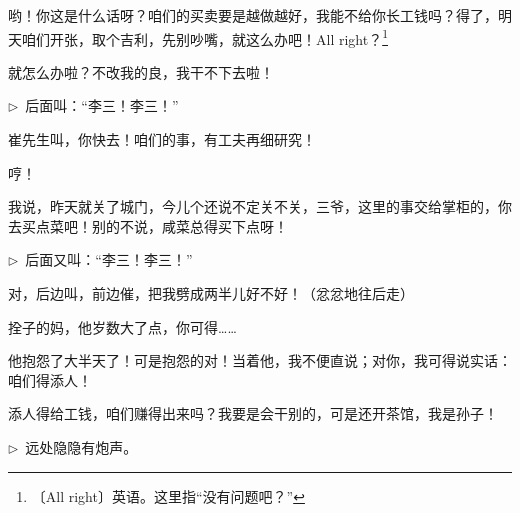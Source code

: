 \documentclass[12pt,UTF-8,openany]{ctexbook}
\begin{document}
\begin{large}
\begin{description}[itemsep=0.5ex,leftmargin=4.5em,labelwidth=4em]
    \item[{\color{script-4-2} 王利发}]哟！你这是什么话呀？咱们的买卖要是越做越好，我能不给你长工钱吗？得了，明天咱们开张，取个吉利，先别吵嘴，就这么办吧！All right？\footnote{〔All right〕英语。这里指“没有问题吧？”}
    
    \item[{\color{script-4-1} 李三}]就怎么办啦？不改我的良，我干不下去啦！
    
    \end{description}
    
    \noindent $\triangleright$~后面叫：“李三！李三！”
    
    \begin{description}[itemsep=0.5ex,leftmargin=4.5em,labelwidth=4em]
    
    \item[{\color{script-4-2} 王利发}]崔先生叫，你快去！咱们的事，有工夫再细研究！
    
    \item[{\color{script-4-1} 李三}]哼！
    
    \item[{\color{script-4-0} 王淑芬}]我说，昨天就关了城门，今儿个还说不定关不关，三爷，这里的事交给掌柜的，你去买点菜吧！别的不说，咸菜总得买下点呀！
    
    \end{description}
    
    \noindent $\triangleright$~后面又叫：“李三！李三！”
    
    \begin{description}[itemsep=0.5ex,leftmargin=4.5em,labelwidth=4em]
    
    \item[{\color{script-4-1} 李三}]对，后边叫，前边催，把我劈成两半儿好不好！（忿忿地往后走）
    
    \item[{\color{script-4-2} 王利发}]拴子的妈，他岁数大了点，你可得……
    
    \item[{\color{script-4-0} 王淑芬}]他抱怨了大半天了！可是抱怨的对！当着他，我不便直说；对你，我可得说实话：咱们得添人！
    
    \item[{\color{script-4-2} 王利发}]添人得给工钱，咱们赚得出来吗？我要是会干别的，可是还开茶馆，我是孙子！
    
    \end{description}
    
    \noindent $\triangleright$~远处隐隐有炮声。
    

\end{large}
\end{document}

